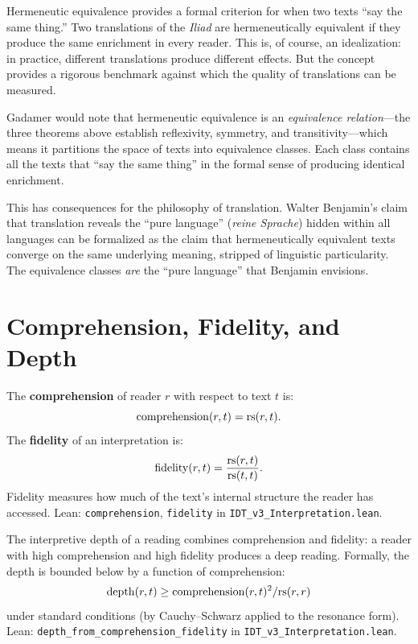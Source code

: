 \begin{interpretation}
\label{interp:herm-equiv-translation}
Hermeneutic equivalence provides a formal criterion for when two texts
``say the same thing.''  Two translations of the \textit{Iliad} are
hermeneutically equivalent if they produce the same enrichment in every
reader.  This is, of course, an idealization: in practice, different
translations produce different effects.  But the concept provides a
rigorous benchmark against which the quality of translations can be measured.

Gadamer would note that hermeneutic equivalence is an \emph{equivalence
relation}---the three theorems above establish reflexivity, symmetry, and
transitivity---which means it partitions the space of texts into equivalence
classes.  Each class contains all the texts that ``say the same thing''
in the formal sense of producing identical enrichment.

This has consequences for the philosophy of translation.  Walter Benjamin's
claim that translation reveals the ``pure language'' (\textit{reine Sprache})
hidden within all languages can be formalized as the claim that
hermeneutically equivalent texts converge on the same underlying meaning,
stripped of linguistic particularity.  The equivalence classes \emph{are}
the ``pure language'' that Benjamin envisions.
\end{interpretation}

\section{Comprehension, Fidelity, and Depth}

\begin{definition}
\label{def:comprehension-fidelity}
The \textbf{comprehension} of reader $r$ with respect to text $t$ is:
\[
\mathrm{comprehension}(r, t) = \mathrm{rs}(r, t).
\]
The \textbf{fidelity} of an interpretation is:
\[
\mathrm{fidelity}(r, t) = \frac{\mathrm{rs}(r, t)}{\mathrm{rs}(t, t)}.
\]
Fidelity measures how much of the text's internal structure the reader
has accessed.
Lean: \texttt{comprehension}, \texttt{fidelity} in
\texttt{IDT\_v3\_Interpretation.lean}.
\end{definition}

\begin{theorem}
\label{thm:depth-from-comp-fidelity}
The interpretive depth of a reading combines comprehension and fidelity:
a reader with high comprehension and high fidelity produces a deep reading.
Formally, the depth is bounded below by a function of comprehension:
\[
\mathrm{depth}(r, t) \geq \mathrm{comprehension}(r, t)^2 / \mathrm{rs}(r, r)
\]
under standard conditions (by Cauchy--Schwarz applied to the resonance form).
Lean: \texttt{depth\_from\_comprehension\_fidelity} in
\texttt{IDT\_v3\_Interpretation.lean}.
\end{theorem}

